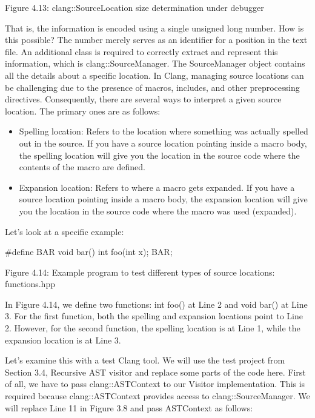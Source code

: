 \begin{center}
Figure 4.13: clang::SourceLocation size determination under debugger
\end{center}

That is, the information is encoded using a single unsigned long number. How is this possible? The number merely serves as an identifier for a position in the text file. An additional class is required to correctly extract and represent this information, which is clang::SourceManager. The SourceManager object contains all the details about a specific location. In Clang, managing source locations can be challenging due to the presence of macros, includes, and other preprocessing directives. Consequently, there are several ways to interpret a given source location. The primary ones are as follows:

\begin{itemize}
\item
Spelling location: Refers to the location where something was actually spelled out in the source. If you have a source location pointing inside a macro body, the spelling location will give you the location in the source code where the contents of the macro are defined.

\item
Expansion location: Refers to where a macro gets expanded. If you have a source location pointing inside a macro body, the expansion location will give you the location in the source code where the macro was used (expanded).
\end{itemize}

Let’s look at a specific example:

\begin{cpp}
#define BAR void bar()
int foo(int x);
BAR;
\end{cpp}

\begin{center}
Figure 4.14: Example program to test different types of source locations: functions.hpp
\end{center}

In Figure 4.14, we define two functions: int foo() at Line 2 and void bar() at Line 3. For the first function, both the spelling and expansion locations point to Line 2. However, for the second function, the spelling location is at Line 1, while the expansion location is at Line 3.

Let’s examine this with a test Clang tool. We will use the test project from Section 3.4, Recursive AST visitor and replace some parts of the code here. First of all, we have to pass clang::ASTContext to our Visitor implementation. This is required because clang::ASTContext provides access to clang::SourceManager. We will replace Line 11 in Figure 3.8 and pass ASTContext as follows:

